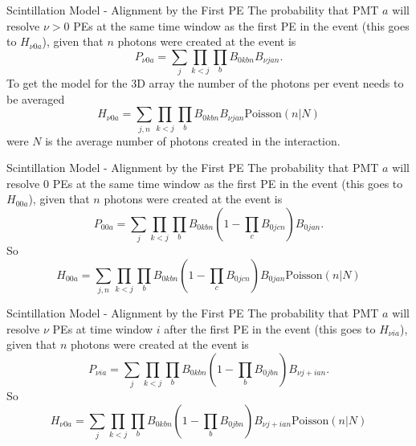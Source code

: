 \documentclass{beamer}
\begin{document}
\begin{frame}{Scintillation Model - Alignment by the First PE}
The probability that PMT $a$ will resolve $\nu>0$ PEs at the same time window as the first PE in the event (this goes to $H_{\nu0a}$), given that $n$ photons were created at the event is
\begin{equation}
P_{\nu0a}=\sum_j\prod_{k<j}\prod_bB_{0kbn}B_{\nu jan}.
\end{equation}
To get the model for the 3D array the number of the photons per event needs to be averaged
\begin{equation}
H_{\nu0a}=\sum_{j,n}\prod_{k<j}\prod_bB_{0kbn}B_{\nu jan}\text{Poisson}(n|N)
\end{equation}
were $N$ is the average number of photons created in the interaction.
\end{frame}

\begin{frame}{Scintillation Model - Alignment by the First PE}
The probability that PMT $a$ will resolve $0$ PEs at the same time window as the first PE in the event (this goes to $H_{00a}$), given that $n$ photons were created at the event is
\begin{equation}
P_{00a}=\sum_j\prod_{k<j}\prod_bB_{0kbn}(1-\prod_cB_{0jcn})B_{0jan}.
\end{equation}
So
\begin{equation}
H_{00a}=\sum_{j,n}\prod_{k<j}\prod_bB_{0kbn}(1-\prod_cB_{0jcn})B_{0jan}\text{Poisson}(n|N)
\end{equation}
\end{frame}


\begin{frame}{Scintillation Model - Alignment by the First PE}
The probability that PMT $a$ will resolve $\nu$ PEs at time window $i$ after the first PE in the event (this goes to $H_{\nu ia}$), given that $n$ photons were created at the event is
\begin{equation}
P_{\nu ia}=\sum_j\prod_{k<j}\prod_bB_{0kbn}(1-\prod_bB_{0jbn})B_{\nu j+ian}.
\end{equation}
So
\begin{equation}
H_{\nu0a}=\sum_j\prod_{k<j}\prod_bB_{0kbn}(1-\prod_bB_{0jbn})B_{\nu j+ian}\text{Poisson}(n|N)
\end{equation}
\end{frame}
\end{document}
